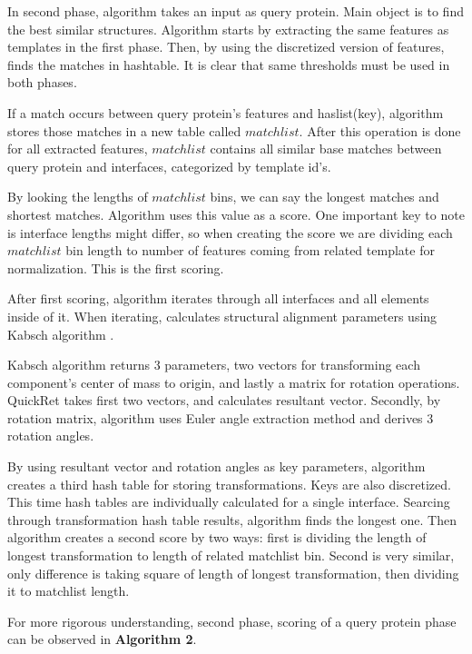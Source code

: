 \documentclass{article}
\begin{document}
In second phase, algorithm takes an input as query protein. Main object is to find the best similar structures. Algorithm starts by extracting the same features as templates in the first phase. Then, by using the discretized version of features, finds the matches in hashtable. It is clear that same thresholds must be used in both phases.

If a match occurs between query protein's features and haslist(key), algorithm stores those matches in a new table called $matchlist$. After this operation is done for all extracted features, $matchlist$ contains all similar base matches between query protein and interfaces, categorized by template id's.

By looking the lengths of $matchlist$ bins, we can say the longest matches and shortest matches. Algorithm uses this value as a score. One important key to note is interface lengths might differ, so when creating the score we are dividing each $matchlist$ bin length to number of features coming from related template for normalization. This is the first scoring.

After first scoring, algorithm iterates through all interfaces and all elements inside of it. When iterating, calculates structural alignment parameters using Kabsch algorithm \citep{Kabsch:a15629}.

Kabsch algorithm returns 3 parameters, two vectors for transforming each component's center of mass to origin, and lastly a matrix for rotation operations. QuickRet takes first two vectors, and calculates resultant vector. Secondly, by rotation matrix, algorithm uses Euler angle extraction method and derives 3 rotation angles.

By using resultant vector and rotation angles as key parameters, algorithm creates a third hash table for storing transformations. Keys are also discretized. This time hash tables are individually calculated for a single interface. Searcing through transformation hash table results, algorithm finds the longest one. Then algorithm creates a second score by two ways: first is dividing the length of longest transformation to length of related matchlist bin. Second is very similar, only difference is taking square of length of longest transformation, then dividing it to matchlist length.

For more rigorous understanding, second phase, scoring of a query protein phase can be observed in \textbf{Algorithm 2}.
\end{document}

